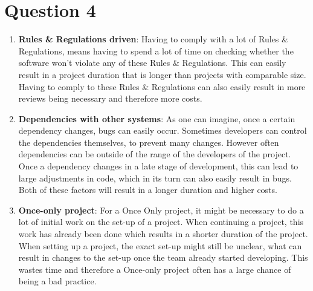 \section{Question 4}

\begin{enumerate}
	\item \textbf{Rules \& Regulations driven}: Having to comply with a lot of Rules \& Regulations, means having to spend a lot of time on checking whether the software won't violate any of these Rules \& Regulations. This can easily result in a project duration that is longer than projects with comparable size. Having to comply to these Rules \& Regulations can also easily result in more reviews being necessary and therefore more costs. 
	\item \textbf{Dependencies with other systems}: As one can imagine, once a certain dependency changes, bugs can easily occur. Sometimes developers can control the dependencies themselves, to prevent many changes. However often dependencies can be outside of the range of the developers of the project. Once a dependency changes in a late stage of development, this can lead to large adjustments in code, which in its turn can also easily result in bugs. Both of these factors will result in a longer duration and higher costs. 
	\item \textbf{Once-only project}: For a Once Only project, it might be necessary to do a lot of initial work on the set-up of a project. When continuing a project, this work has already been done which results in a shorter duration of the project. When setting up a project, the exact set-up might still be unclear, what can result in changes to the set-up once the team already started developing. This wastes time and therefore a Once-only project often has a large chance of being a bad practice. 
\end{enumerate}